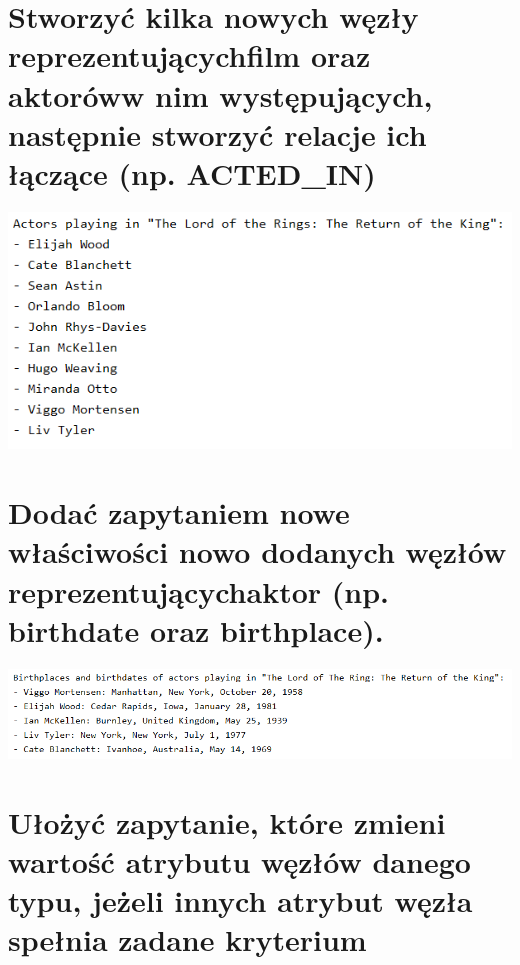 \documentclass[a4paper, 11pt]{article}
\begin{document}
    \newpage

    \section{ Stworzyć kilka nowych węzły reprezentującychfilm oraz aktoróww nim występujących, następnie
    stworzyć relacje ich łączące (np. ACTED\_IN)}

    

    \begin{center}
        \includegraphics{images/task4.png}
    \end{center}

    \newpage

    \section{Dodać zapytaniem nowe właściwości nowo dodanych węzłów reprezentującychaktor (np. birthdate
    oraz birthplace).}

    

    \begin{center}
        \includegraphics{images/task5.png}
    \end{center}

    \newpage

    \section{Ułożyć zapytanie, które zmieni wartość atrybutu węzłów danego typu, jeżeli innych atrybut węzła
    spełnia zadane kryterium}
\end{document}
